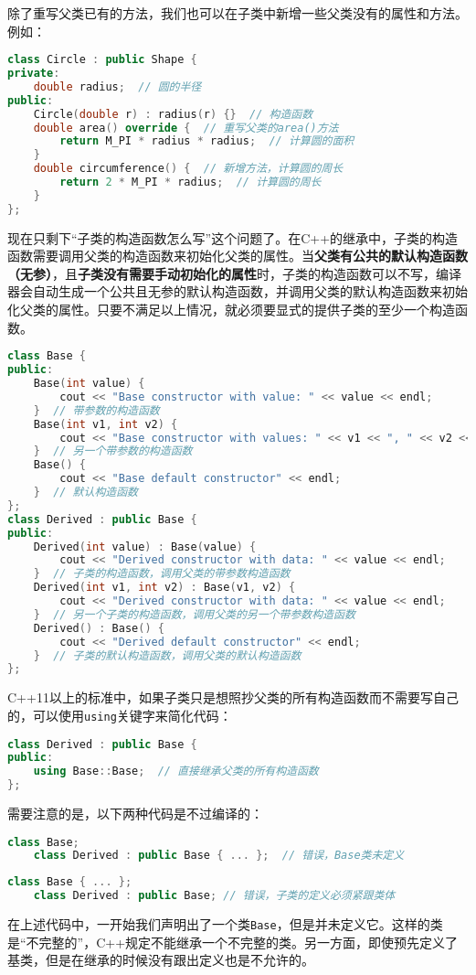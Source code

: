 \documentclass[../main.tex]{subfiles}
\begin{document}
除了重写父类已有的方法，我们也可以在子类中新增一些父类没有的属性和方法。例如：
\begin{lstlisting}[language=C++]
class Circle : public Shape {
private:
    double radius;  // 圆的半径
public:
    Circle(double r) : radius(r) {}  // 构造函数
    double area() override {  // 重写父类的area()方法
        return M_PI * radius * radius;  // 计算圆的面积
    }
    double circumference() {  // 新增方法，计算圆的周长
        return 2 * M_PI * radius;  // 计算圆的周长
    }
};
\end{lstlisting}

现在只剩下“子类的构造函数怎么写”这个问题了。在C++的继承中，子类的构造函数需要调用父类的构造函数来初始化父类的属性。当\textbf{父类有公共的默认构造函数（无参）}，且\textbf{子类没有需要手动初始化的属性}时，子类的构造函数可以不写，编译器会自动生成一个公共且无参的默认构造函数，并调用父类的默认构造函数来初始化父类的属性。只要不满足以上情况，就必须要显式的提供子类的至少一个构造函数。
\begin{lstlisting}[language=C++]
class Base {
public:
    Base(int value) {
        cout << "Base constructor with value: " << value << endl;
    }  // 带参数的构造函数
    Base(int v1, int v2) {
        cout << "Base constructor with values: " << v1 << ", " << v2 << endl;
    }  // 另一个带参数的构造函数
    Base() {
        cout << "Base default constructor" << endl;
    }  // 默认构造函数
};
class Derived : public Base {
public:
    Derived(int value) : Base(value) {
        cout << "Derived constructor with data: " << value << endl;
    }  // 子类的构造函数，调用父类的带参数构造函数
    Derived(int v1, int v2) : Base(v1, v2) {
        cout << "Derived constructor with data: " << value << endl;
    }  // 另一个子类的构造函数，调用父类的另一个带参数构造函数
    Derived() : Base() {
        cout << "Derived default constructor" << endl;
    }  // 子类的默认构造函数，调用父类的默认构造函数
};
\end{lstlisting}

C++11以上的标准中，如果子类只是想照抄父类的所有构造函数而不需要写自己的，可以使用\texttt{using}关键字来简化代码：
\begin{lstlisting}[language=C++]
class Derived : public Base {
public:
    using Base::Base;  // 直接继承父类的所有构造函数
};
\end{lstlisting}

需要注意的是，以下两种代码是不过编译的：
\begin{lstlisting}[language=C++]
    class Base;
    class Derived : public Base { ... };  // 错误，Base类未定义
\end{lstlisting}
\begin{lstlisting}[language=C++]
    class Base { ... };
    class Derived : public Base; // 错误，子类的定义必须紧跟类体
\end{lstlisting}
在上述代码中，一开始我们声明出了一个类\texttt{Base}，但是并未定义它。这样的类是“不完整的”，C++规定不能继承一个不完整的类。另一方面，即使预先定义了基类，但是在继承的时候没有跟出定义也是不允许的。
\end{document}
